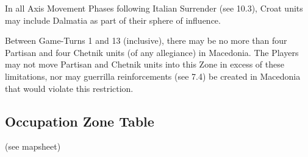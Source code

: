  In all Axis Movement Phases following Italian Surrender (see 10.3), Croat units may include Dalmatia as part of their sphere of influence.

 Between Game-Turns 1 and 13 (inclusive), there may be no more than four Partisan and four Chetnik units (of any allegiance) in Macedonia. The Players may not move Partisan and Chetnik units into this Zone in excess of these limitations, nor may guerrilla reinforcements (see 7.4) be created in Macedonia that would violate this restriction.

\subsection{Occupation Zone Table}\label{sec:6.7}

(see mapsheet)
